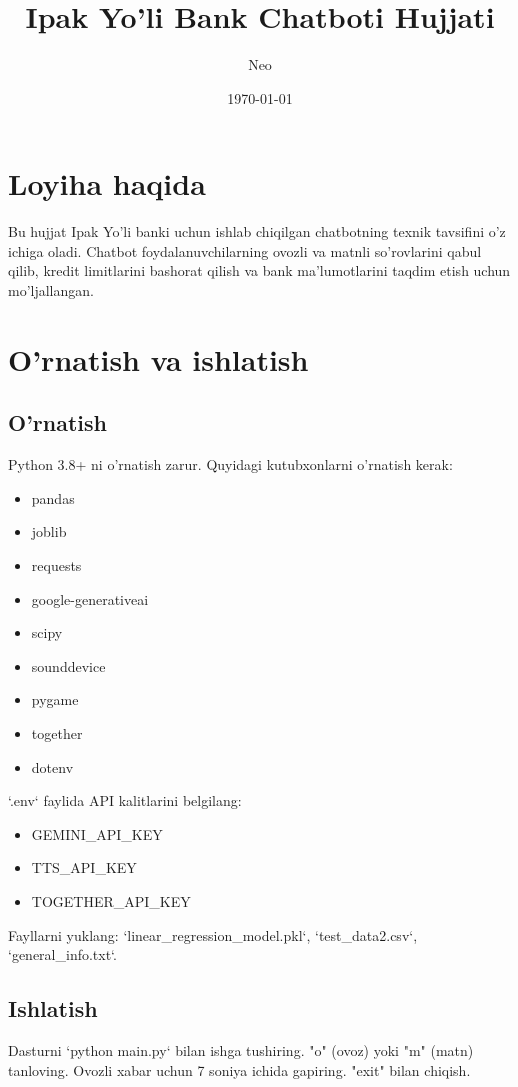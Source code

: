 \documentclass[a4paper,12pt]{article}
\title{Ipak Yo'li Bank Chatboti Hujjati}
\author{Neo}
\date{\today}
\begin{document}
\maketitle

\section{Loyiha haqida}
Bu hujjat Ipak Yo'li banki uchun ishlab chiqilgan chatbotning texnik tavsifini o'z ichiga oladi. Chatbot foydalanuvchilarning ovozli va matnli so'rovlarini qabul qilib, kredit limitlarini bashorat qilish va bank ma'lumotlarini taqdim etish uchun mo'ljallangan.

\section{O'rnatish va ishlatish}
\subsection{O'rnatish}
Python 3.8+ ni o'rnatish zarur. Quyidagi kutubxonlarni o'rnatish kerak:
\begin{itemize}
    \item pandas
    \item joblib
    \item requests
    \item google-generativeai
    \item scipy
    \item sounddevice
    \item pygame
    \item together
    \item dotenv
\end{itemize}
`.env` faylida API kalitlarini belgilang:
\begin{itemize}
    \item GEMINI\_API\_KEY
    \item TTS\_API\_KEY
    \item TOGETHER\_API\_KEY
\end{itemize}
Fayllarni yuklang: `linear_regression_model.pkl`, `test_data2.csv`, `general_info.txt`.

\subsection{Ishlatish}
Dasturni `python main.py` bilan ishga tushiring. "o" (ovoz) yoki "m" (matn) tanloving. Ovozli xabar uchun 7 soniya ichida gapiring. "exit" bilan chiqish.
\end{document}
